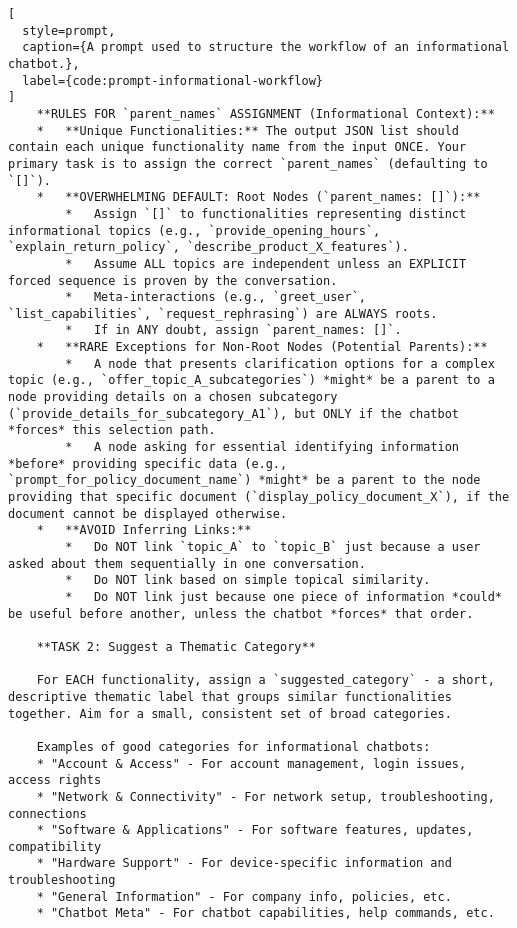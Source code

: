 \begin{lstlisting}[
  style=prompt,
  caption={A prompt used to structure the workflow of an informational chatbot.},
  label={code:prompt-informational-workflow}
]
    **RULES FOR `parent_names` ASSIGNMENT (Informational Context):**
    *   **Unique Functionalities:** The output JSON list should contain each unique functionality name from the input ONCE. Your primary task is to assign the correct `parent_names` (defaulting to `[]`).
    *   **OVERWHELMING DEFAULT: Root Nodes (`parent_names: []`):**
        *   Assign `[]` to functionalities representing distinct informational topics (e.g., `provide_opening_hours`, `explain_return_policy`, `describe_product_X_features`).
        *   Assume ALL topics are independent unless an EXPLICIT forced sequence is proven by the conversation.
        *   Meta-interactions (e.g., `greet_user`, `list_capabilities`, `request_rephrasing`) are ALWAYS roots.
        *   If in ANY doubt, assign `parent_names: []`.
    *   **RARE Exceptions for Non-Root Nodes (Potential Parents):**
        *   A node that presents clarification options for a complex topic (e.g., `offer_topic_A_subcategories`) *might* be a parent to a node providing details on a chosen subcategory (`provide_details_for_subcategory_A1`), but ONLY if the chatbot *forces* this selection path.
        *   A node asking for essential identifying information *before* providing specific data (e.g., `prompt_for_policy_document_name`) *might* be a parent to the node providing that specific document (`display_policy_document_X`), if the document cannot be displayed otherwise.
    *   **AVOID Inferring Links:**
        *   Do NOT link `topic_A` to `topic_B` just because a user asked about them sequentially in one conversation.
        *   Do NOT link based on simple topical similarity.
        *   Do NOT link just because one piece of information *could* be useful before another, unless the chatbot *forces* that order.

    **TASK 2: Suggest a Thematic Category**

    For EACH functionality, assign a `suggested_category` - a short, descriptive thematic label that groups similar functionalities together. Aim for a small, consistent set of broad categories.

    Examples of good categories for informational chatbots:
    * "Account & Access" - For account management, login issues, access rights
    * "Network & Connectivity" - For network setup, troubleshooting, connections
    * "Software & Applications" - For software features, updates, compatibility
    * "Hardware Support" - For device-specific information and troubleshooting
    * "General Information" - For company info, policies, etc.
    * "Chatbot Meta" - For chatbot capabilities, help commands, etc.


\end{lstlisting}
